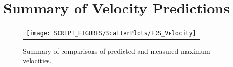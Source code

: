 \section{Summary of Velocity Predictions}
\label{Velocity}

\begin{figure}[h!]
\begin{center}
\begin{tabular}{l}
\texttt{[image: SCRIPT\_FIGURES/ScatterPlots/FDS\_Velocity]}
\end{tabular}
\end{center}
\caption[Summary of velocity predictions]
{Summary of comparisons of predicted and measured maximum velocities.}
\label{Steckler_Scatterplot}
\end{figure}


